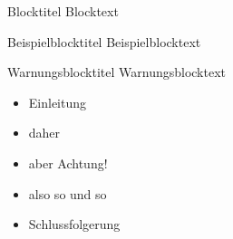 \documentclass[hyperref={pdfpagelabels=false}]{beamer}
\begin{document}
	\begin{frame}
		\begin{block}{Blocktitel}
		        Blocktext
		\end{block}
		
		\begin{exampleblock}{Beispielblocktitel}
		        Beispielblocktext
		\end{exampleblock}
		
		\begin{alertblock}{Warnungsblocktitel}
			                Warnungsblocktext
		\end{alertblock}
	\end{frame}
	
	\begin{frame}
		\begin{itemize}
		        \item Einleitung
		        \item<2-> daher
		        \item<alert@3> aber Achtung!
		        \item<3-> also so und so
		        \item<4-> Schlussfolgerung
		\end{itemize}
	\end{frame}
\end{document}
